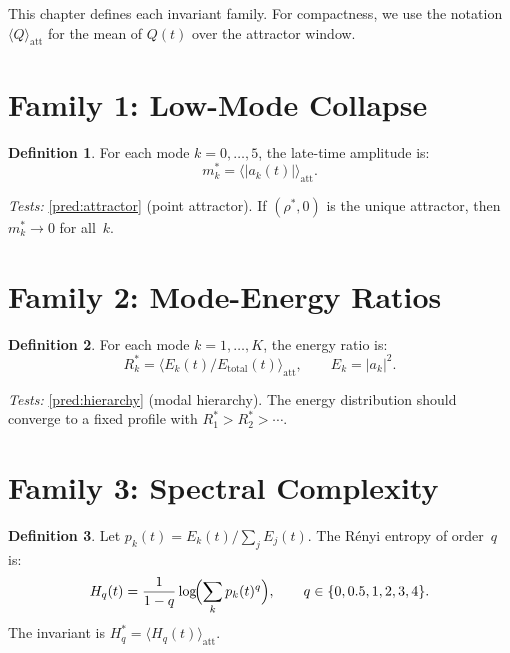 \documentclass[11pt,twoside,openright]{book}
\theoremstyle{definition}
\newtheorem{definition}{Definition}[chapter]
\theoremstyle{plain}
\theoremstyle{definition}
\theoremstyle{remark}
\newcommand{\rhostar}{\rho^{*}}
\newcommand{\att}{\mathrm{att}}
\begin{document}
This chapter defines each invariant family. For compactness, we use the notation \(\langle Q \rangle_\att\) for the mean of \(Q(t)\) over the attractor window.

\section{Family 1: Low-Mode Collapse}\label{sec:fam-lowmode}

\begin{definition}\label{def:lowmode}
For each mode \(k = 0, \ldots, 5\), the late-time amplitude is:
\begin{equation}\label{eq:lowmode}
m_k^* = \bigl\langle |a_k(t)| \bigr\rangle_\att.
\end{equation}
\end{definition}

\noindent\emph{Tests:} \cref{pred:attractor} (point attractor). If \((\rhostar, 0)\) is the unique attractor, then \(m_k^* \to 0\) for all~\(k\).

\section{Family 2: Mode-Energy Ratios}\label{sec:fam-moderatio}

\begin{definition}\label{def:moderatio}
For each mode \(k = 1, \ldots, K\), the energy ratio is:
\begin{equation}\label{eq:moderatio}
R_k^* = \bigl\langle E_k(t) / E_{\mathrm{total}}(t) \bigr\rangle_\att, \qquad E_k = |a_k|^2.
\end{equation}
\end{definition}

\noindent\emph{Tests:} \cref{pred:hierarchy} (modal hierarchy). The energy distribution should converge to a fixed profile with \(R_1^* > R_2^* > \cdots\).

\section{Family 3: Spectral Complexity}\label{sec:fam-renyi}

\begin{definition}\label{def:renyi}
Let \(p_k(t) = E_k(t)/\sum_j E_j(t)\). The R\'{e}nyi entropy of order~\(q\) is:
\begin{equation}\label{eq:renyi}
H_q(t) = \frac{1}{1-q}\log\!\Bigl(\sum_k p_k(t)^q\Bigr), \qquad q \in \{0, 0.5, 1, 2, 3, 4\}.
\end{equation}
The invariant is \(H_q^* = \langle H_q(t) \rangle_\att\).
\end{definition}
\end{document}
